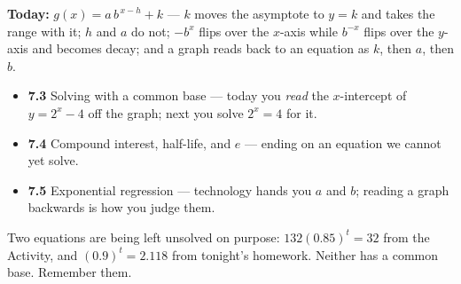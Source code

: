 \documentclass[aspectratio=169, 11pt]{beamer}
\begin{document}
\begin{frame}[t, plain]
  \textbf{Today:} $g(x)=a\,b^{\,x-h}+k$ --- $k$ moves the asymptote to $y=k$ and takes the range with
  it; $h$ and $a$ do not; $-b^{x}$ flips over the $x$-axis while $b^{-x}$ flips over the $y$-axis and
  becomes decay; and a graph reads back to an equation as $k$, then $a$, then $b$.\\[8pt]
  \begin{itemize}\setlength{\itemsep}{3pt}
    \item \textbf{7.3} Solving with a common base --- today you \emph{read} the $x$-intercept of $y=2^{x}-4$ off the graph; next you solve $2^{x}=4$ for it.
    \item \textbf{7.4} Compound interest, half-life, and $e$ --- ending on an equation we cannot yet solve.
    \item \textbf{7.5} Exponential regression --- technology hands you $a$ and $b$; reading a graph backwards is how you judge them.
  \end{itemize}
  \vspace{6pt}
  \begin{center}
    {\footnotesize Two equations are being left unsolved on purpose: $132(0.85)^{t}=32$ from the
    Activity, and $(0.9)^{t}=2.118$ from tonight's homework. Neither has a common base. Remember them.}
  \end{center}
\end{frame}
\end{document}
